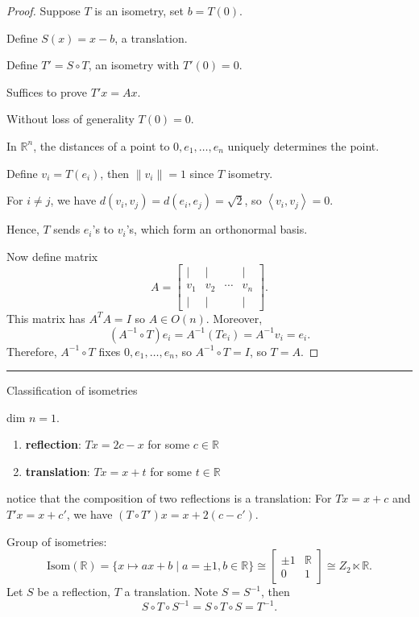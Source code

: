 \documentclass[12pt]{article}
\newcommand{\keyword}[1]{\textbf{#1}}
\newcommand{\sepline}{\rule{\textwidth}{0.4pt}}
\theoremstyle{definition}
\newcommand{\R}{\mathbb{R}}
\newcommand{\<}{\left\langle}
\renewcommand{\>}{\right\rangle}
\newcommand{\iso}{\cong}
\newcommand{\Isom}{\mathrm{Isom}}
\newcommand{\mat}[1]{\begin{bmatrix}#1\end{bmatrix}}
\begin{document}
\begin{proof}
    Suppose $T$ is an isometry, set $b = T(0)$.

    Define $S(x) = x - b$, a translation.

    Define $T' = S \circ T$, an isometry with $T'(0) = 0$.

    Suffices to prove $T'x = Ax$.
    
    Without loss of generality $T(0) = 0$.

    In $\R^n$, the distances of a point to $0, e_1, \dots, e_n$ uniquely determines the point.

    Define $v_i = T(e_i)$, then $\|v_i\| = 1$ since $T$ isometry.

    For $i \ne j$, we have $d(v_i, v_j) = d(e_i, e_j) = \sqrt{2}$, so $\<v_i, v_j\> = 0$.

    Hence, $T$ sends $e_i$'s to $v_i$'s, which form an orthonormal basis.

    Now define matrix
    \[
        A = \mat{| & | & & | \\ v_1 & v_2 & \cdots & v_n \\ | & | & & |}.
    \]
    This matrix has $A^TA = I$ so $A \in O(n)$.
    Moreover, 
    \[
        (A^{-1} \circ T)e_i
            = A^{-1}(Te_i)
            = A^{-1}v_i
            = e_i.
    \]
    Therefore, $A^{-1} \circ T$ fixes $0, e_1, \dots, e_n$, so $A^{-1} \circ T = I$, so $T = A$.
\end{proof}

\sepline

Classification of isometries

dim $n = 1$.
\begin{enumerate}
    \item \keyword{reflection}: $Tx = 2c - x$ for some $c \in \R$
    \item \keyword{translation}: $Tx = x + t$ for some $t \in \R$
\end{enumerate}

notice that the composition of two reflections is a translation: For $Tx = x + c$ and $T'x = x + c'$, we have $(T \circ T')x = x + 2(c - c')$.

Group of isometries:
\[
    \Isom(\R)
        = \{x \mapsto ax + b \mid a = \pm1, b \in \R\}
        \iso \mat{\pm1 & \R \\ 0 & 1}
        \iso Z_2 \ltimes \R.
\]
Let $S$ be a reflection, $T$ a translation.
Note $S = S^{-1}$, then
\[
    S \circ T \circ S^{-1}
        = S \circ T \circ S
        = T^{-1}.  
\]
\end{document}
